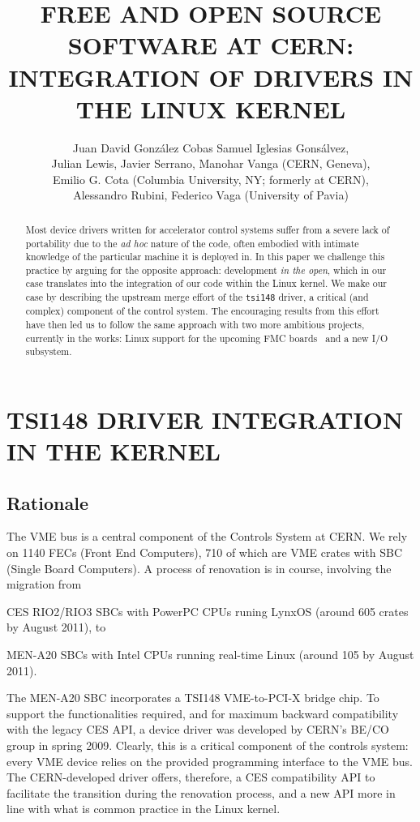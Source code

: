 \documentclass{JAC2003}
\title{%
    FREE AND OPEN SOURCE SOFTWARE AT CERN:\\
    INTEGRATION OF DRIVERS IN THE LINUX KERNEL}
\author{%
	Juan David Gonz\'alez Cobas Samuel Iglesias Gons\'alvez,\\
	Julian Lewis, Javier Serrano, Manohar Vanga (CERN, Geneva),\\ 
	Emilio G. Cota (Columbia University, NY; formerly at CERN), \\
	Alessandro Rubini, Federico Vaga (University of Pavia)}
\begin{document}
\maketitle
\begin{abstract}
    Most device drivers written for accelerator control systems suffer from a
    severe lack of portability due to the \emph{ad hoc} nature of the code,
    often embodied with intimate knowledge of the particular machine it is
    deployed in.
    In this paper we challenge this practice by arguing for the opposite
    approach: development \emph{in the open}, which in our case translates
    into the integration of our code within the Linux kernel. We make our
    case by describing the upstream merge effort of the \texttt{tsi148}
    driver, a critical (and complex) component of the control system.
    The encouraging results from this effort have then led us to follow the
    same approach with two more ambitious projects, currently in the works:
    Linux support for the upcoming FMC boards~\cite{fpga-fmc,vita-fmc}
    and a new I/O subsystem.
\end{abstract}


\section{TSI148 DRIVER INTEGRATION IN THE KERNEL}
\subsection{Rationale}
The VME bus is a central component of the Controls System at CERN. We rely
on 1140 FECs (Front End Computers), 710 of which are VME crates with SBC
(Single Board Computers). A process of renovation is in course, involving
the migration from
\begin{Itemize}
\item CES RIO2/RIO3 SBCs with PowerPC CPUs runing LynxOS (around 605
    crates by August 2011), to
\item MEN-A20 SBCs with Intel CPUs running real-time Linux (around 105 by
    August 2011).
\end{Itemize}

The MEN-A20 SBC incorporates a TSI148 VME-to-PCI-X bridge chip.  To support
the functionalities required, and for maximum backward compatibility with
the legacy CES API, a device driver was developed by CERN's BE/CO group in
spring 2009. Clearly, this is a critical component of the controls system:
every VME device relies on the provided programming interface to the VME
bus. The CERN-developed driver offers, therefore, a CES compatibility API
to facilitate the transition during the renovation process, and a new API
more in line with what is common practice in the Linux kernel.
\end{document}
